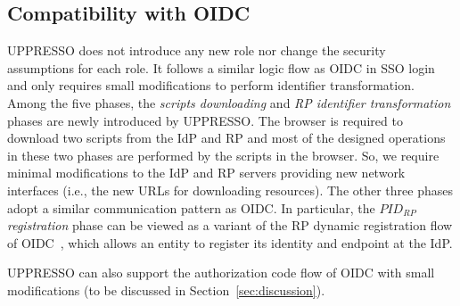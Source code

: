 \subsection{Compatibility with OIDC}
\label{subsec:compatible}
UPPRESSO does not introduce any new role nor change the security assumptions for each role. It follows a similar logic flow as OIDC in SSO login and only requires small modifications to perform identifier transformation.
Among the five phases, the {\em scripts downloading} and {\em RP identifier transformation} phases are newly introduced by UPPRESSO. The browser is required to download two scripts from the IdP and RP and most of the designed operations in these two phases are performed by the scripts in the browser. So, we require minimal modifications to the IdP and RP servers providing new network interfaces (i.e., the new URLs for downloading resources). The other three phases adopt a similar communication pattern as OIDC. In particular, the {\em $PID_{RP}$ registration} phase can be viewed as a variant of the RP dynamic registration flow of OIDC~\cite{DynamicRegistration}, which allows an entity to register its identity and endpoint at the IdP.

UPPRESSO can also support the authorization code flow of OIDC with small modifications (to be discussed in Section~\ref{sec:discussion}).

